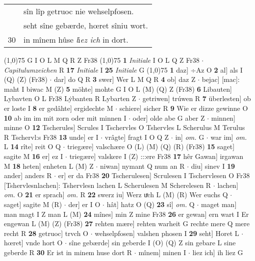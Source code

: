 \documentclass[8pt,a4paper,notitlepage]{article}
\begin{document}
\begin{table}[ht]
\begin{minipage}[t]{0.5\linewidth}
\begin{tabular}{rl}
 & sîn lîp getruoc nie wehselpfosen.\\ 
 & seht sîne gebærde, hœret sîniu wort.\\ 
30 & in mînem hûse \textit{l}i\textit{ez ich} in dort.\\ 
\end{tabular}
\scriptsize
\line(1,0){75} \newline
G I O L M Q R Z Fr38 \newline
\line(1,0){75} \newline
\textbf{1} \textit{Initiale} I O L Q Z Fr38   $\cdot$ \textit{Capitulumzeichen} R  \textbf{17} \textit{Initiale} I  \textbf{25} \textit{Initiale} G  \newline
\line(1,0){75} \newline
\textbf{1} daz] ÷Az O \textbf{2} al] als I (Q) (Z) (Fr38)  $\cdot$ dar] do Q R \textbf{3} swer] Wer L M Q R \textbf{4} ob] daz Z  $\cdot$ bejac] [mac]: maht I biwac M (Z) \textbf{5} möhte] mohte G I O L (M) (Q) Z (Fr38) \textbf{6} Libauten] Lybavten O L Fr38 Lẏbanten R Lybarten Z  $\cdot$ getriwen] trúwen R \textbf{7} überlesten] ob er loste I \textbf{8} er gedâhte] ergidechte M  $\cdot$ schiere] sicher R \textbf{9} Wie er dizze gewinne O \textbf{10} ab im im mit zorn oder mit minnen I  $\cdot$ oder] olde abe G aber Z  $\cdot$ minnen] minne O \textbf{12} Tscherules] Scrules I Tschervles O Tshervles L Scherulus M Terulus R Tschervl:s Fr38 \textbf{13} unde] er I  $\cdot$ vrâgte] fragt I O Q Z  $\cdot$ in] \textit{om.} G  $\cdot$ war im] \textit{om.} L \textbf{14} rîte] reit O Q  $\cdot$ triegære] valschære O (L) (M) (Q) (R) (Fr38) \textbf{15} saget] sagite M \textbf{16} er] ez I  $\cdot$ triegære] valskere I (Z) :::ere Fr38 \textbf{17} hêr Gawan] irgawan M \textbf{18} heten] enheten L (M) Z  $\cdot$ niwan] nymant Q num an R  $\cdot$ diu] sinev I \textbf{19} ander] anders R  $\cdot$ er] er da Fr38 \textbf{20} Tscherulesen] Scrulesen I Tschervlesen O Fr38 [Tshervlesnlachen]: Tshervlesn lachen L Scherulesen M Scherelesen R  $\cdot$ lachen] \textit{om.} O \textbf{21} er sprach] \textit{om.} R \textbf{22} swerz iu] Werz uͯch L (M) (R) Wer euchs Q  $\cdot$ saget] sagite M (R)  $\cdot$ der] er I O  $\cdot$ hât] hatz O (Q) \textbf{23} sî] \textit{om.} Q  $\cdot$ maget man] man magt I Z man L (M) \textbf{24} mînes] min Z mine Fr38 \textbf{26} er gewan] ern wart I Er engewan L (M) (Z) (Fr38) \textbf{27} rehten mære] rehten warheit G rechte mere Q mere recht R \textbf{28} getruoc] trvch O  $\cdot$ wehselpfosen] valshen phosen I \textbf{29} seht] Horet L  $\cdot$ hœret] vnde hort O  $\cdot$ sîne gebærde] sin geberde I (O) (Q) Z sin gebare L sine geberde R \textbf{30} Er ist in minem huse dort R  $\cdot$ mînem] minen I  $\cdot$ liez ich] ih liez G \newline

\end{minipage}
\end{table}
\end{document}
